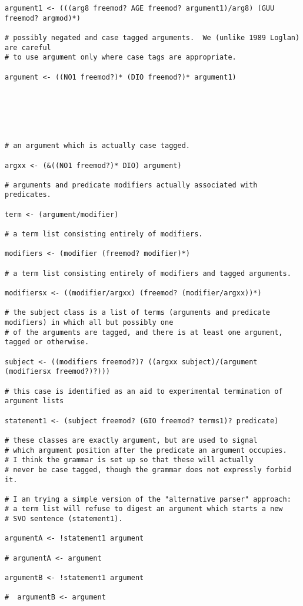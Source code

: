 \documentclass{article}
\begin{document}
\begin{verbatim}
argument1 <- (((arg8 freemod? AGE freemod? argument1)/arg8) (GUU freemod? argmod)*)

# possibly negated and case tagged arguments.  We (unlike 1989 Loglan) are careful
# to use argument only where case tags are appropriate.

argument <- ((NO1 freemod?)* (DIO freemod?)* argument1)






# an argument which is actually case tagged.

argxx <- (&((NO1 freemod?)* DIO) argument)

# arguments and predicate modifiers actually associated with predicates.

term <- (argument/modifier)

# a term list consisting entirely of modifiers.

modifiers <- (modifier (freemod? modifier)*)

# a term list consisting entirely of modifiers and tagged arguments.

modifiersx <- ((modifier/argxx) (freemod? (modifier/argxx))*)

# the subject class is a list of terms (arguments and predicate modifiers) in which all but possibly one
# of the arguments are tagged, and there is at least one argument, tagged or otherwise.

subject <- ((modifiers freemod?)? ((argxx subject)/(argument (modifiersx freemod?)?)))

# this case is identified as an aid to experimental termination of argument lists

statement1 <- (subject freemod? (GIO freemod? terms1)? predicate)

# these classes are exactly argument, but are used to signal
# which argument position after the predicate an argument occupies.
# I think the grammar is set up so that these will actually
# never be case tagged, though the grammar does not expressly forbid it.

# I am trying a simple version of the "alternative parser" approach:
# a term list will refuse to digest an argument which starts a new
# SVO sentence (statement1).

argumentA <- !statement1 argument 

# argumentA <- argument

argumentB <- !statement1 argument 

#  argumentB <- argument


\end{verbatim}
\end{document}
